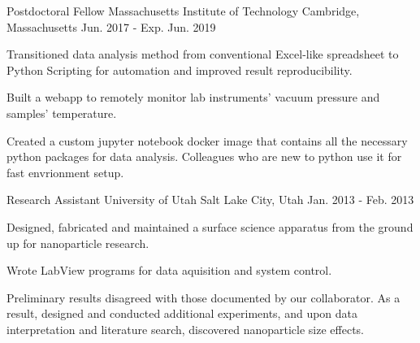 


\begin{cventries}


\cventry
{Postdoctoral Fellow} %
{Massachusetts Institute of Technology} %
{Cambridge, Massachusetts} %
{Jun. 2017 - Exp. Jun. 2019} %
{ %
\begin{cvitems}
\item {Transitioned data analysis method from conventional Excel-like
    spreadsheet to Python Scripting for automation and improved result
    reproducibility.}
\item {Built a webapp to remotely monitor lab instruments' vacuum pressure and
    samples' temperature.}
\item {Created a custom jupyter notebook docker image that contains all the
    necessary python packages for data analysis. Colleagues who are new to
    python use it for fast envrionment setup.}
\end{cvitems}
}


\cventry
{Research Assistant}
{University of Utah}
{Salt Lake City, Utah}
{Jan. 2013 - Feb. 2013}
{
\begin{cvitems}
\item {Designed, fabricated and maintained a surface science apparatus from the
    ground up for nanoparticle research.}
\item {Wrote LabView programs for data aquisition and system control.}
\item {Preliminary results disagreed with those documented by our collaborator.
    As a result, designed and conducted additional experiments, and
    upon data interpretation and literature search, discovered nanoparticle size
    effects.}
\end{cvitems}
}


\end{cventries}